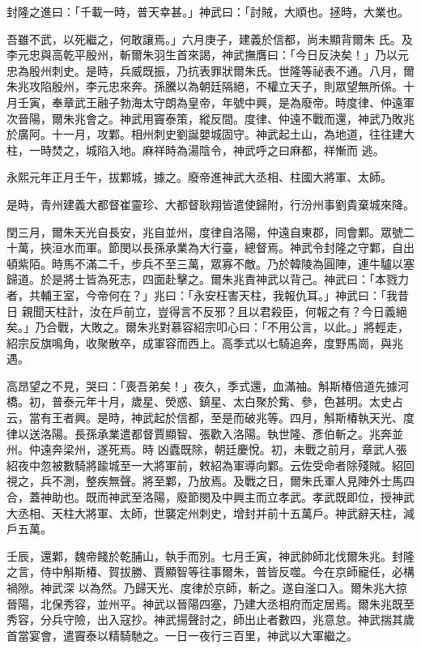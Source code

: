 \begin{pinyinscope}
 封隆之進曰：「千載一時，普天幸甚。」神武曰：「討賊，大順也。拯時，大業也。



 吾雖不武，以死繼之，何敢讓焉。」六月庚子，建義於信都，尚未顯背爾朱
 氏。及李元忠與高乾平殷州，斬爾朱羽生首來謁，神武撫膺曰：「今日反決矣！」乃以元忠為殷州刺史。是時，兵威既振，乃抗表罪狀爾朱氏。世隆等祕表不通。八月，爾朱兆攻陷殷州，李元忠來奔。孫騰以為朝廷隔絕，不權立天子，則眾望無所係。十月壬寅，奉章武王融子勃海太守朗為皇帝，年號中興，是為廢帝。時度律、仲遠軍次晉陽，爾朱兆會之。神武用竇泰策，縱反間。度律、仲遠不戰而還，神武乃敗兆於廣阿。十一月，攻鄴。相州刺史劉誕嬰城固守。神武起土山，為地道，往往建大柱，一時焚之，城陷入地。麻祥時為湯陰令，神武呼之曰麻都，祥慚而
 逃。



 永熙元年正月壬午，拔鄴城，據之。廢帝進神武大丞相、柱國大將軍、太師。



 是時，青州建義大都督崔靈珍、大都督耿翔皆遣使歸附，行汾州事劉貴棄城來降。



 閏三月，爾朱天光自長安，兆自並州，度律自洛陽，仲遠自東郡，同會鄴。眾號二十萬，挾洹水而軍。節閔以長孫承業為大行臺，總督焉。神武令封隆之守鄴，自出頓紫陌。時馬不滿二千，步兵不至三萬，眾寡不敵。乃於韓陵為圓陣，連牛驢以塞歸道。於是將士皆為死志，四面赴擊之。爾朱兆責神武以背己。神武曰：「本戮力者，共輔王室，今帝何在？」兆曰：「永安枉害天柱，我報仇耳。」神武曰：「我昔日
 親聞天柱計，汝在戶前立，豈得言不反邪？且以君殺臣，何報之有？今日義絕矣。」乃合戰，大敗之。爾朱兆對慕容紹宗叩心曰：「不用公言，以此。」將輕走，紹宗反旗鳴角，收聚散卒，成軍容而西上。高季式以七騎追奔，度野馬崗，與兆遇。



 高昂望之不見，哭曰：「喪吾弟矣！」夜久，季式還，血滿袖。斛斯椿倍道先據河橋。初，普泰元年十月，歲星、熒惑、鎮星、太白聚於觜、參，色甚明。太史占云，當有王者興。是時，神武起於信都，至是而破兆等。四月，斛斯椿執天光、度律以送洛陽。長孫承業遣都督賈顯智、張歡入洛陽。執世隆、彥伯斬之。兆奔並州。仲遠奔梁州，遂死焉。時
 凶蠹既除，朝廷慶悅。初，未戰之前月，章武人張紹夜中忽被數騎將踰城至一大將軍前，敕紹為軍導向鄴。云佐受命者除殘賊。紹回視之，兵不測，整疾無聲。將至鄴，乃放焉。及戰之日，爾朱氏軍人見陣外士馬四合，蓋神助也。既而神武至洛陽，廢節閔及中興主而立孝武。孝武既即位，授神武大丞相、天柱大將軍、太師，世襲定州刺史，增封并前十五萬戶。神武辭天柱，減戶五萬。



 壬辰，還鄴，魏帝餞於乾脯山，執手而別。七月壬寅，神武帥師北伐爾朱兆。封隆之言，侍中斛斯椿、賀拔勝、賈顯智等往事爾朱，普皆反噬。今在京師寵任，必構禍隙。神武深
 以為然。乃歸天光、度律於京師，斬之。遂自滏口入。爾朱兆大掠晉陽，北保秀容，並州平。神武以晉陽四塞，乃建大丞相府而定居焉。爾朱兆既至秀容，分兵守險，出入寇抄。神武揚聲討之，師出止者數四，兆意怠。神武揣其歲首當宴會，遣竇泰以精騎馳之。一日一夜行三百里，神武以大軍繼之。




\end{pinyinscope}
